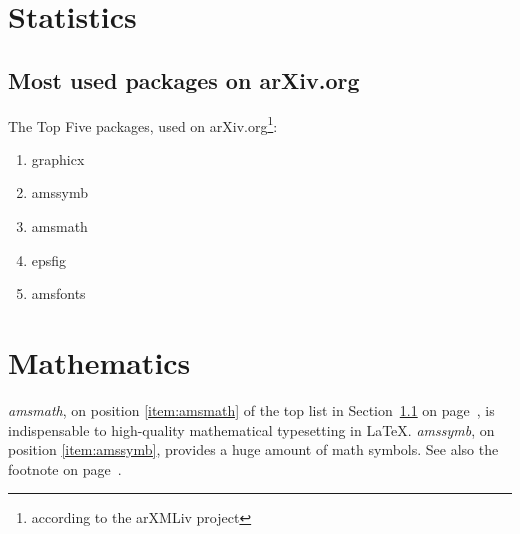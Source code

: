 \documentclass{book}
\begin{document}
\tableofcontents
\chapter{Statistics}

\section{Most used packages on arXiv.org} %
\label{sec:packages}

The Top Five packages, used on arXiv.org\footnote{according to the arXMLiv project\label{fn:project}}:
\begin{enumerate}
  \item graphicx
  \item amssymb \label{item:amssymb}
  \item amsmath \label{item:amsmath}
  \item epsfig \label{item:epsfig}
  \item amsfonts
\end{enumerate}

\chapter{Mathematics} %
\label{cha:mathematics}
\emph{amsmath}, on position \ref{item:amsmath} of the top list in Section~\ref{sec:packages} on page~\pageref{sec:packages}, is indispensable to high-quality mathematical typesetting in \LaTeX. \emph{amssymb}, on position \ref{item:amssymb}, provides a huge amount of math symbols.
See also the footnote on page~\pageref{fn:project}.


\end{document}
